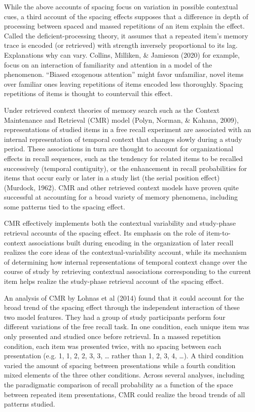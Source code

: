 While the above accounts of spacing focus on variation in possible contextual cues, a third account of the spacing effects supposes that a difference in depth of processing between spaced and massed repetitions of an item explain the effect. Called the deficient-processing theory, it assumes that a repeated item’s memory trace is encoded (or retrieved) with strength inversely proportional to its lag. Explanations why can vary. Collins, Milliken, & Jamieson (2020) for example, focus on an interaction of familiarity and attention in a model of the phenomenon. “Biased exogenous attention” might favor unfamiliar, novel items over familiar ones leaving repetitions of items encoded less thoroughly. Spacing repetitions of items is thought to countervail this effect.

Under retrieved context theories of memory search such as the Context Maintenance and Retrieval (CMR) model (Polyn, Norman, & Kahana, 2009), representations of studied items in a free recall experiment are associated with an internal representation of temporal context that changes slowly during a study period. These associations in turn are thought to account for organizational effects in recall sequences, such as the tendency for related items to be recalled successively (temporal contiguity), or the enhancement in recall probabilities for items that occur early or later in a study list (the serial position effect) (Murdock, 1962). CMR and other retrieved context models have proven quite successful at accounting for a broad variety of memory phenomena, including some patterns tied to the spacing effect.

CMR effectively implements both the contextual variability and study-phase retrieval accounts of the spacing effect. Its emphasis on the role of item-to-context associations built during encoding in the organization of later recall realizes the core ideas of the contextual-variability account, while its mechanism of determining how internal representations of temporal context change over the course of study by retrieving contextual associations corresponding to the current item helps realize the study-phase retrieval account of the spacing effect. 

An analysis of CMR by Lohnas et al (2014) found that it could account for the broad trend of the spacing effect through the independent interaction of these two model features. They had a group of study participants perform four different variations of the free recall task. In one condition, each unique item was only presented and studied once before retrieval. In a massed repetition condition, each item was presented twice, with no spacing between each presentation (e.g. 1, 1, 2, 2, 3, 3, … rather than 1, 2, 3, 4, …). A third condition varied the amount of spacing between presentations while a fourth condition mixed elements of the three other conditions. Across several analyses, including the paradigmatic comparison of recall probability as a function of the space between repeated item presentations, CMR could realize the broad trends of all patterns studied.

